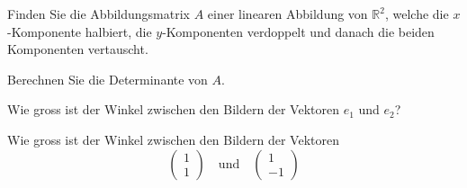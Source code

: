 Finden Sie die Abbildungsmatrix $A$ einer linearen Abbildung von $\mathbb R^2$,
welche die $x$-Komponente halbiert, die $y$-Komponenten verdoppelt und
danach die beiden Komponenten vertauscht.
\begin{teilaufgaben}
\item Berechnen Sie die Determinante von $A$.
\item Wie gross ist der Winkel zwischen den Bildern der Vektoren
$e_1$ und $e_2$?
\item Wie gross ist der Winkel zwischen den Bildern der Vektoren
\[
\begin{pmatrix}1\\1\end{pmatrix}\quad\text{und}\quad
\begin{pmatrix}1\\-1\end{pmatrix}
\]
\end{teilaufgaben}


